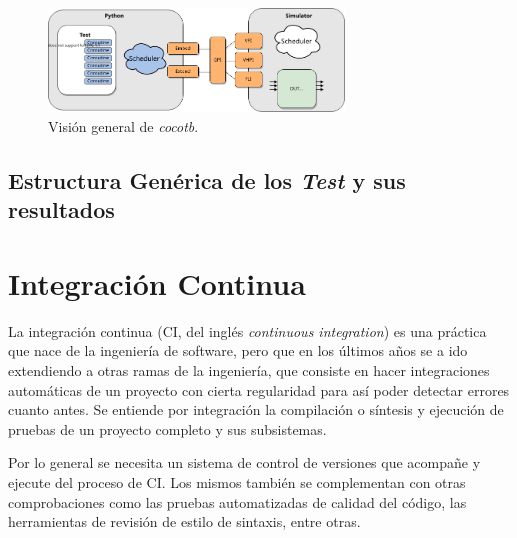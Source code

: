 \begin{figure}[h]
  \centering
  \includegraphics[width=0.7\textwidth]{./Figures/cocotb_overview.png}
  \caption{Visión general de \textit{cocotb}.}
\end{figure}


\subsection{Estructura Genérica de los \textit{Test} y sus resultados}

\section{Integración Continua}

La integración continua (CI, del inglés \textit{continuous integration}) es una
práctica que nace de la ingeniería de software, pero que en los últimos años se
a ido extendiendo a otras ramas de la ingeniería, que consiste en hacer
integraciones automáticas de un proyecto con cierta regularidad para así poder
detectar errores cuanto antes. Se entiende por integración la compilación o
síntesis y ejecución de pruebas de un proyecto completo y sus subsistemas. 

Por lo general se necesita un sistema de control de versiones que acompañe y
ejecute del proceso de CI\@. Los mismos también se complementan con otras
comprobaciones como las pruebas automatizadas de calidad del código, las
herramientas de revisión de estilo de sintaxis, entre otras.

